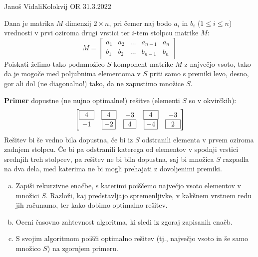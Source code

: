 \begin{naloga}{Janoš Vidali}{Kolokvij OR 31.3.2022}
\begin{vprasanje}
Dana je matrika $M$ dimenzij $2 \times n$,
pri čemer naj bodo $a_i$ in $b_i$ ($1 \le i \le n$)
vrednosti v prvi oziroma drugi vrstici ter $i$-tem stolpcu matrike $M$:
$$
M = \begin{bmatrix}
a_1 & a_2 & \dots & a_{n-1} & a_n \\
b_1 & b_2 & \dots & b_{n-1} & b_n
\end{bmatrix}
$$
Poiskati želimo tako podmnožico $S$ komponent matrike $M$ z največjo vsoto,
tako da je mogoče med poljubnima elementoma v $S$
priti samo s premiki levo, desno, gor ali dol (ne diagonalno!) tako,
da ne zapustimo množice $S$.

{\bf Primer} dopustne (ne nujno optimalne!) rešitve
(elementi $S$ so v okvirčkih):
$$
\begin{bmatrix}
\fbox{$\,\ 4\ \,$} & \fbox{$\,\ 4\ \,$} & -3 & \fbox{$\,\ 4\ \,$} & -3 \\
-1 & \fbox{$-2$} & \fbox{$\ 4\ $} & \fbox{$-4$} & \fbox{$\,\ 2\ \,$}
\end{bmatrix}
$$
Rešitev bi še vedno bila dopustna,
če bi iz $S$ odstranili elementa v prvem oziroma zadnjem stolpcu.
Če bi pa odstranili katerega od elementov
v spodnji vrstici srednjih treh stolpcev,
pa rešitev ne bi bila dopustna,
saj bi množica $S$ razpadla na dva dela,
med katerima ne bi mogli prehajati z dovoljenimi premiki.

\begin{enumerate}[(a)]
\item Zapiši rekurzivne enačbe,
s katerimi poiščemo največjo vsoto elementov v množici $S$.
Razloži, kaj pred\-stav\-lja\-jo spremenljivke,
v kakšnem vrstnem redu jih računamo,
ter kako dobimo optimalno rešitev.

\item Oceni časovno zahtevnost algoritma, ki sledi iz zgoraj zapisanih enačb.

\item S svojim algoritmom poišči optimalno rešitev
(tj., največjo vsoto in še samo množico $S$)
na zgornjem primeru.
\end{enumerate}
\end{vprasanje}


\end{naloga}
